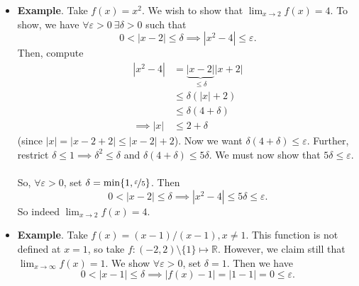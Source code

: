 \documentclass{article}
\newcommand{\R}{\mathbb{R}}
\newcommand{\?}{\stackrel{?}{=}}
\newcommand{\smallblacksquare}{\rule{0.5em}{0.5em}}
\theoremstyle{definition} %
\begin{document}
\begin{itemize}
\begin{proof}
\begin{itemize}[label=\smallblacksquare]
                        $$0 < |x - x_0| \leq \delta_1 \implies |f(x) - l_1| \leq \varepsilon.$$
                  \item $l_2$ a limit means $\exists \delta_2 > 0$ such that
                        $$0 < |x - x_0| \leq \delta_2 \implies |f(x) - l_2| \leq \varepsilon.$$
              \end{itemize}
              Then, compute for $0 < |x - x_0| \leq \min\{\delta_1, \delta_2\}$
              \begin{align*}
                  l_2 - l_1 & \leq |l_2 - f(x)| + |l_1 - f(x)|              \\
                            & \leq \varepsilon + \varepsilon = 2\varepsilon \\
                            & = \frac{l_2 - l_1}{2} < l_2 - l_1.
              \end{align*}
              Of course, this is a contradiction so $l_1 = l_2$.
          \end{proof}
    \item \textbf{Example}. Take $f(x) = x^2$. We wish to show that $\lim_{x \to 2} f(x) = 4$. To show, we have $\forall \varepsilon > 0 \ \exists \delta > 0$ such that
          $$0 < |x - 2| \leq \delta \implies |x^2 - 4| \leq \varepsilon.$$
          Then, compute
          \begin{align*}
              |x^2 - 4|    & = \underbrace{|x - 2|}_{\leq \delta}|x + 2| \\
                           & \leq \delta(|x| + 2)                        \\
                           & \leq \delta(4 + \delta)                     \\
              \implies |x| & \leq 2 + \delta
          \end{align*}
          (since $|x| = |x - 2 + 2| \leq |x - 2| + 2$). Now we want $\delta(4 + \delta) \leq \varepsilon$. Further, restrict $\delta \leq 1 \implies \delta^2 \leq \delta$ and $\delta(4 + \delta) \leq 5\delta$. We must now show that $5\delta \leq \varepsilon$. \\\\
          So, $\forall \varepsilon > 0$, set $\delta = \min\{1, \nicefrac{\varepsilon}{5}\}$. Then
          $$0 < |x - 2| \leq \delta \implies |x^2 - 4| \leq 5\delta \leq \varepsilon.$$
          So indeed $\lim_{x \to 2} f(x) = 4$.
    \item \textbf{Example}. Take $f(x) = (x - 1)/(x - 1), x \neq 1$. This function is not defined at $x = 1$, so take $f: (-2, 2) \setminus \{1\} \mapsto \R$. However, we claim still that $\lim_{x \to \infty} f(x) = 1$. We show $\forall \varepsilon > 0$, set $\delta = 1$. Then we have
          $$0 < |x - 1| \leq \delta \implies |f(x) - 1| = |1 - 1| = 0 \leq \varepsilon.$$
\end{itemize}
\end{document}
